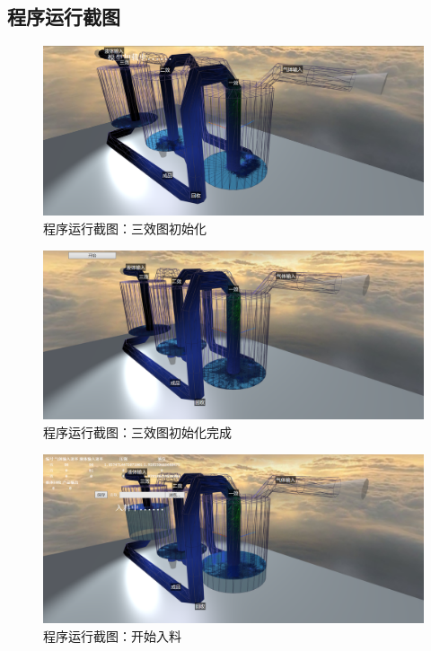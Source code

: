 \documentclass[a4paper]{ctexart}
\begin{document}
\begin{spacing}{1.25}
\section{程序运行截图}
\begin{figure}[htbp]
	\centering
	\includegraphics [width=\textwidth]{figure//res0.png}
	\caption{程序运行截图：三效图初始化}
\end{figure}
\begin{figure}[htbp]
	\centering
	\includegraphics [width=\textwidth]{figure//res1.png}
	\caption{程序运行截图：三效图初始化完成}
\end{figure}
\begin{figure}[htbp]
	\centering
	\includegraphics [width=\textwidth]{figure//res2.png}
	\caption{程序运行截图：开始入料}
\end{figure}
\begin{figure}[htbp]

\end{figure}
\end{spacing}
\end{document}
